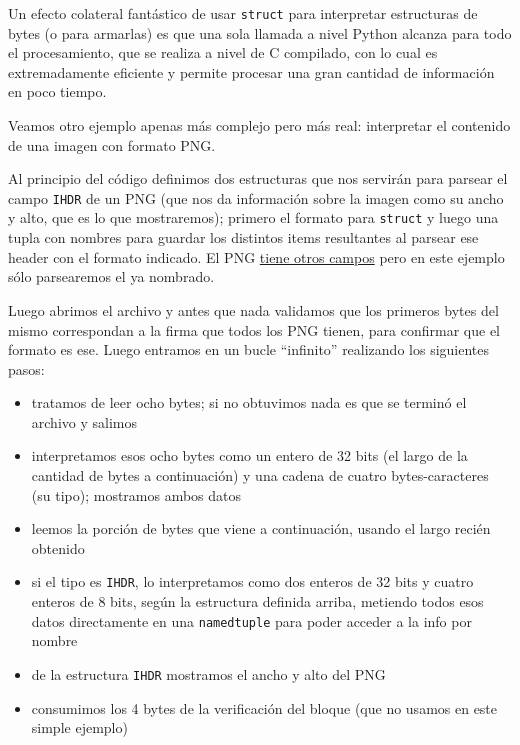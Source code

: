 Un efecto colateral fantástico de usar \texttt{struct} para interpretar estructuras de bytes (o para armarlas) es que una sola llamada a nivel Python alcanza para todo el procesamiento, que se realiza a nivel de C compilado, con lo cual es extremadamente eficiente y permite procesar una gran cantidad de información en poco tiempo.

Veamos otro ejemplo apenas más complejo pero más real: interpretar el contenido de una imagen con formato PNG.


Al principio del código definimos dos estructuras que nos servirán para parsear el campo \texttt{IHDR} de un PNG (que nos da información sobre la imagen como su ancho y alto, que es lo que mostraremos); primero el formato para \texttt{struct} y luego una tupla con nombres para guardar los distintos items resultantes al parsear ese header con el formato indicado. El PNG \href{https://en.wikipedia.org/wiki/PNG}{tiene otros campos} pero en este ejemplo sólo parsearemos el ya nombrado.

Luego abrimos el archivo y antes que nada validamos que los primeros bytes del mismo correspondan a la firma que todos los PNG tienen, para confirmar que el formato es ese. Luego entramos en un bucle ``infinito'' realizando los siguientes pasos:

\begin{itemize}
    \item tratamos de leer ocho bytes; si no obtuvimos nada es que se terminó el archivo y salimos
    \item interpretamos esos ocho bytes como un entero de 32 bits (el largo de la cantidad de bytes a continuación) y una cadena de cuatro bytes-caracteres (su tipo); mostramos ambos datos
    \item leemos la porción de bytes que viene a continuación, usando el largo recién obtenido
    \item si el tipo es \texttt{IHDR}, lo interpretamos como dos enteros de 32 bits y cuatro enteros de 8 bits, según la estructura definida arriba, metiendo todos esos datos directamente en una \texttt{namedtuple} para poder acceder a la info por nombre
    \item de la estructura \texttt{IHDR} mostramos el ancho y alto del PNG
    \item consumimos los 4 bytes de la verificación del bloque (que no usamos en este simple ejemplo)
\end{itemize}


